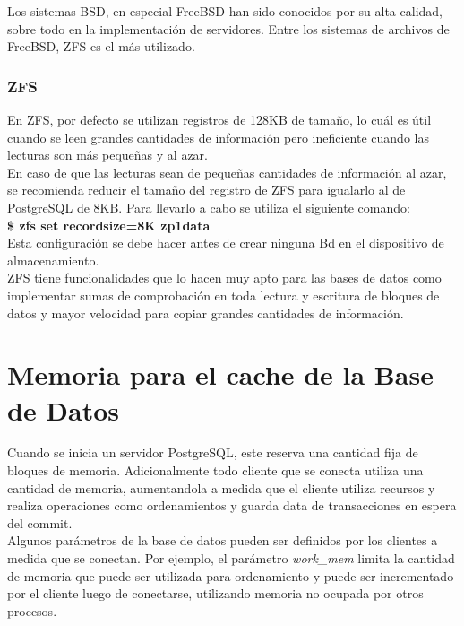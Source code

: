 Los sistemas BSD, en especial FreeBSD han sido conocidos por su alta calidad, sobre todo en la implementación de servidores. Entre los sistemas de archivos de FreeBSD, ZFS es el más utilizado.

\subsubsection{ZFS}

En ZFS, por defecto se utilizan registros de 128KB de tamaño, lo cuál es útil cuando se leen grandes cantidades de información pero ineficiente cuando las lecturas son más pequeñas y al azar.\\

En caso de que las lecturas sean de pequeñas cantidades de información al azar, se recomienda reducir el tamaño del registro de ZFS para igualarlo al de PostgreSQL de 8KB. Para llevarlo a cabo se utiliza el siguiente comando:\\

\textbf{\$ zfs set recordsize=8K zp1\/data}\\

Esta configuración se debe hacer antes de crear ninguna Bd en el dispositivo de almacenamiento.\\

ZFS tiene funcionalidades que lo hacen muy apto para las bases de datos como implementar sumas de comprobación en toda lectura y escritura de bloques de datos y mayor velocidad para copiar grandes cantidades de información.

\section{Memoria para el cache de la Base de Datos}

Cuando se inicia un servidor PostgreSQL, este reserva una cantidad fija de bloques de memoria. Adicionalmente todo cliente que se conecta utiliza una cantidad de memoria, aumentandola a medida que el cliente utiliza recursos y realiza operaciones como ordenamientos y guarda data de transacciones en espera del commit.\\

Algunos parámetros de la base de datos pueden ser definidos por los clientes a medida que se conectan. Por ejemplo, el parámetro  \textit{work\_mem} limita la cantidad de memoria que puede ser utilizada para ordenamiento y puede ser incrementado por el cliente luego de conectarse, utilizando memoria no ocupada por otros procesos.\\

